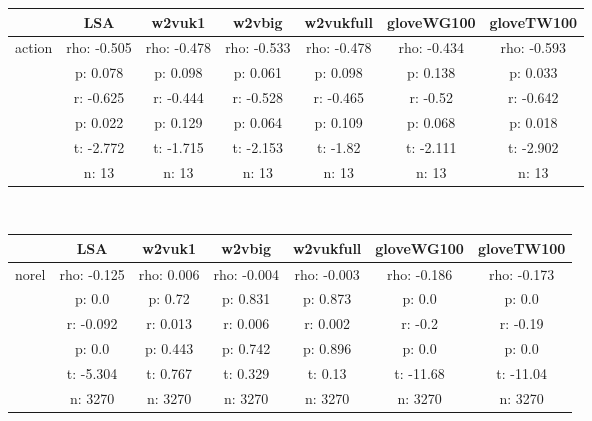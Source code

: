 \documentclass{article}
\begin{document}
\begin{tabular}{ccccccc|}\cline{2-7}
&\multicolumn{1}{|c}{LSA} & w2vuk1 & w2vbig & w2vukfull & gloveWG100 & gloveTW100 \\\hline
\multicolumn{1}{|c|}{\multirow{6}{*}{action}} & rho: -0.505 & rho: -0.478 & rho: -0.533 & rho: -0.478 & rho: -0.434 & rho: -0.593 \\
\multicolumn{1}{|c|}{} & p: 0.078 & p: 0.098 & p: 0.061 & p: 0.098 & p: 0.138 & p: 0.033 \\
\multicolumn{1}{|c|}{} & r: -0.625 & r: -0.444 & r: -0.528 & r: -0.465 & r: -0.52 & r: -0.642 \\
\multicolumn{1}{|c|}{} & p: 0.022 & p: 0.129 & p: 0.064 & p: 0.109 & p: 0.068 & p: 0.018 \\
\multicolumn{1}{|c|}{} & t: -2.772 & t: -1.715 & t: -2.153 & t: -1.82 & t: -2.111 & t: -2.902 \\
\multicolumn{1}{|c|}{} & n: 13 & n: 13 & n: 13 & n: 13 & n: 13 & n: 13 \\
\hline
\end{tabular}\\
\begin{tabular}{ccccccc|}\cline{2-7}
&\multicolumn{1}{|c}{LSA} & w2vuk1 & w2vbig & w2vukfull & gloveWG100 & gloveTW100 \\\hline
\multicolumn{1}{|c|}{\multirow{6}{*}{norel}} & rho: -0.125 & rho: 0.006 & rho: -0.004 & rho: -0.003 & rho: -0.186 & rho: -0.173 \\
\multicolumn{1}{|c|}{} & p: 0.0 & p: 0.72 & p: 0.831 & p: 0.873 & p: 0.0 & p: 0.0 \\
\multicolumn{1}{|c|}{} & r: -0.092 & r: 0.013 & r: 0.006 & r: 0.002 & r: -0.2 & r: -0.19 \\
\multicolumn{1}{|c|}{} & p: 0.0 & p: 0.443 & p: 0.742 & p: 0.896 & p: 0.0 & p: 0.0 \\
\multicolumn{1}{|c|}{} & t: -5.304 & t: 0.767 & t: 0.329 & t: 0.13 & t: -11.68 & t: -11.04 \\
\multicolumn{1}{|c|}{} & n: 3270 & n: 3270 & n: 3270 & n: 3270 & n: 3270 & n: 3270 \\
\hline
\end{tabular}\\
\end{document}
